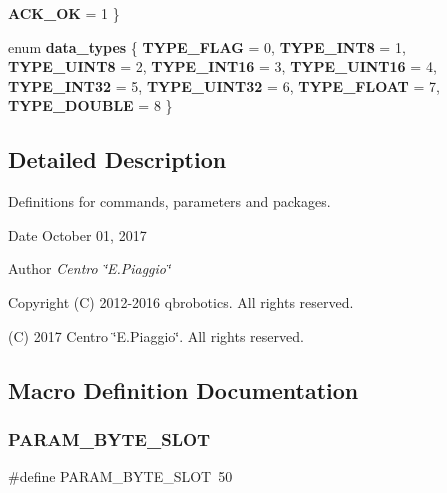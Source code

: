\begin{DoxyCompactItemize}
{\bfseries A\+C\+K\+\_\+\+OK} = 1
 \}
\item 
\mbox{\label{commands_8h_aee7544e5fa6e2843ecdc3609602e56aa}} 
enum {\bfseries data\+\_\+types} \{ \newline
{\bfseries T\+Y\+P\+E\+\_\+\+F\+L\+AG} = 0, 
{\bfseries T\+Y\+P\+E\+\_\+\+I\+N\+T8} = 1, 
{\bfseries T\+Y\+P\+E\+\_\+\+U\+I\+N\+T8} = 2, 
{\bfseries T\+Y\+P\+E\+\_\+\+I\+N\+T16} = 3, 
\newline
{\bfseries T\+Y\+P\+E\+\_\+\+U\+I\+N\+T16} = 4, 
{\bfseries T\+Y\+P\+E\+\_\+\+I\+N\+T32} = 5, 
{\bfseries T\+Y\+P\+E\+\_\+\+U\+I\+N\+T32} = 6, 
{\bfseries T\+Y\+P\+E\+\_\+\+F\+L\+O\+AT} = 7, 
\newline
{\bfseries T\+Y\+P\+E\+\_\+\+D\+O\+U\+B\+LE} = 8
 \}
\end{DoxyCompactItemize}


\subsection{Detailed Description}
Definitions for commands, parameters and packages. 

\begin{DoxyDate}{Date}
October 01, 2017 
\end{DoxyDate}
\begin{DoxyAuthor}{Author}
{\itshape Centro \char`\"{}\+E.\+Piaggio\char`\"{}} 
\end{DoxyAuthor}
\begin{DoxyCopyright}{Copyright}
(C) 2012-\/2016 qbrobotics. All rights reserved. 

(C) 2017 Centro \char`\"{}\+E.\+Piaggio\char`\"{}. All rights reserved. 
\end{DoxyCopyright}


\subsection{Macro Definition Documentation}
\mbox{\label{commands_8h_ae3302107827a773be3200e459e7b24da}} 
\subsubsection{P\+A\+R\+A\+M\+\_\+\+B\+Y\+T\+E\+\_\+\+S\+L\+OT}
{\footnotesize\ttfamily \#define P\+A\+R\+A\+M\+\_\+\+B\+Y\+T\+E\+\_\+\+S\+L\+OT~50}

